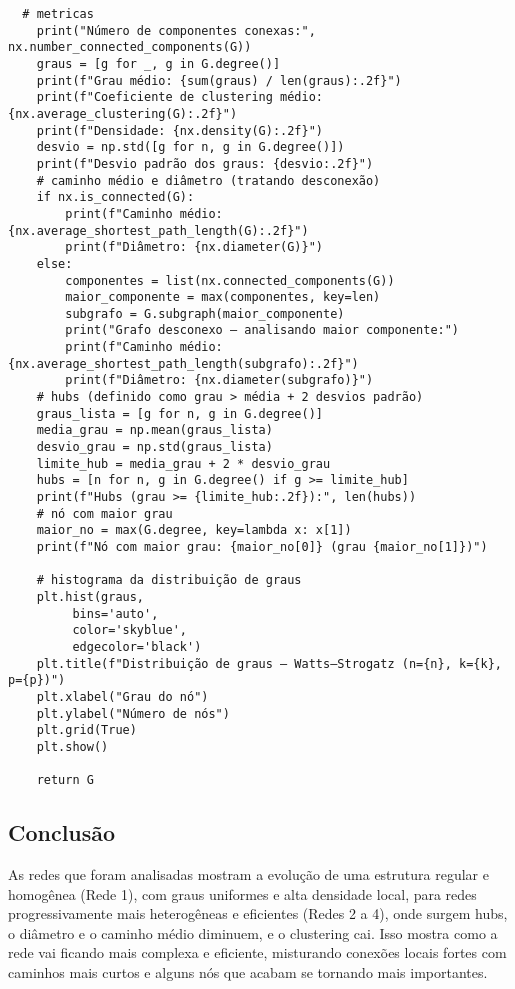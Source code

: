 \documentclass[a4paper]{article}
\begin{document}
\begin{verbatim}
  # metricas
    print("Número de componentes conexas:", nx.number_connected_components(G))
    graus = [g for _, g in G.degree()]
    print(f"Grau médio: {sum(graus) / len(graus):.2f}")
    print(f"Coeficiente de clustering médio: {nx.average_clustering(G):.2f}")
    print(f"Densidade: {nx.density(G):.2f}")
    desvio = np.std([g for n, g in G.degree()])
    print(f"Desvio padrão dos graus: {desvio:.2f}")
    # caminho médio e diâmetro (tratando desconexão)
    if nx.is_connected(G):
        print(f"Caminho médio: {nx.average_shortest_path_length(G):.2f}")
        print(f"Diâmetro: {nx.diameter(G)}")
    else:
        componentes = list(nx.connected_components(G))
        maior_componente = max(componentes, key=len)
        subgrafo = G.subgraph(maior_componente)
        print("Grafo desconexo — analisando maior componente:")
        print(f"Caminho médio: {nx.average_shortest_path_length(subgrafo):.2f}")
        print(f"Diâmetro: {nx.diameter(subgrafo)}")
    # hubs (definido como grau > média + 2 desvios padrão)
    graus_lista = [g for n, g in G.degree()]
    media_grau = np.mean(graus_lista)
    desvio_grau = np.std(graus_lista)
    limite_hub = media_grau + 2 * desvio_grau
    hubs = [n for n, g in G.degree() if g >= limite_hub]
    print(f"Hubs (grau >= {limite_hub:.2f}):", len(hubs))
    # nó com maior grau
    maior_no = max(G.degree, key=lambda x: x[1])
    print(f"Nó com maior grau: {maior_no[0]} (grau {maior_no[1]})")

    # histograma da distribuição de graus
    plt.hist(graus, 
         bins='auto',
         color='skyblue', 
         edgecolor='black')
    plt.title(f"Distribuição de graus — Watts–Strogatz (n={n}, k={k}, p={p})")
    plt.xlabel("Grau do nó")
    plt.ylabel("Número de nós")
    plt.grid(True)
    plt.show()

    return G

\end{verbatim}

\subsection*{Conclusão}

As redes que foram analisadas mostram a evolução de uma estrutura regular e homogênea (Rede 1), com graus uniformes e alta densidade local, para redes progressivamente mais heterogêneas e eficientes (Redes 2 a 4), onde surgem hubs, o diâmetro e o caminho médio diminuem, e o clustering cai. Isso mostra como a rede vai ficando mais complexa e eficiente, misturando conexões locais fortes com caminhos mais curtos e alguns nós que acabam se tornando mais importantes.
\end{document}
